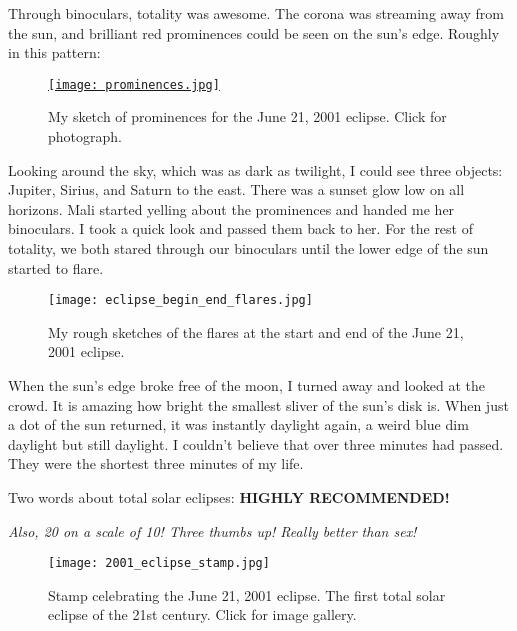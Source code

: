 Through binoculars, totality was awesome. The corona was streaming away
from the sun, and brilliant red prominences could be seen on the sun's
edge. Roughly in this pattern:

\begin{SCfigure}[1][!h]
\centering
\href{https://conceptcontrol.smugmug.com/Trips/Overseas/Zambia-Eclipse-Trip-1/i-WGmRwTJ/A}{\texttt{[image: prominences.jpg]}}
\caption[My sketch of prominences for the June 21, 2001 eclipse]{My sketch of prominences for the June 21, 2001 eclipse. Click for photograph.}
\label{fig:8074X2}
\end{SCfigure}

Looking around the sky, which was as dark as twilight, I could see three
objects: Jupiter, Sirius, and Saturn to the east. There was a sunset
glow low on all horizons. Mali started yelling about the prominences and handed
me her binoculars. I took a quick look and passed them back to her. For
the rest of totality, we both stared through our binoculars until the
lower edge of the sun started to flare.


\begin{SCfigure}
\centering
\texttt{[image: eclipse\_begin\_end\_flares.jpg]}
\caption[Flare sketches at the start and end of the June 21, 2001 eclipse]{My rough sketches of the flares at the start and end of the June 21, 2001 eclipse.}
\label{fig:8074X4}
\end{SCfigure}

When the sun's edge broke free of the moon, I turned away and looked at
the crowd. It is amazing how bright the
smallest sliver of the sun's disk is. When just a dot of the sun
returned, it was instantly daylight again, a weird blue dim daylight but
still daylight. I couldn't believe that over three minutes had passed.
They were the shortest three minutes of my life.

Two words about total solar eclipses: \textbf{HIGHLY RECOMMENDED!}

\emph{Also, 20 on a scale of 10! Three thumbs up! Really better than sex!}

\begin{SCfigure}[1][!h]
\centering
\texttt{[image: 2001\_eclipse\_stamp.jpg]}
\caption[Stamp celebrating the June 21, 2001 eclipse]{Stamp celebrating the June 21, 2001 eclipse. The first total
solar eclipse of the 21st century. Click for image gallery.}
\label{fig:8074X5}
\end{SCfigure}

%
